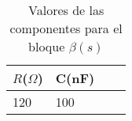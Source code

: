 \begin{table}[htb]
		\tamano\centering
		\caption{Valores de las componentes para el bloque $\beta(s)$}
		\label{tabla:componentesBeta}
		\begin{tabular}{|l|l|l|l|}
			\hline
			$R$($\Omega$) & C(nF)  \\ \hline
			120 & 100 \\ \hline
		\end{tabular}
\end{table}    
    
